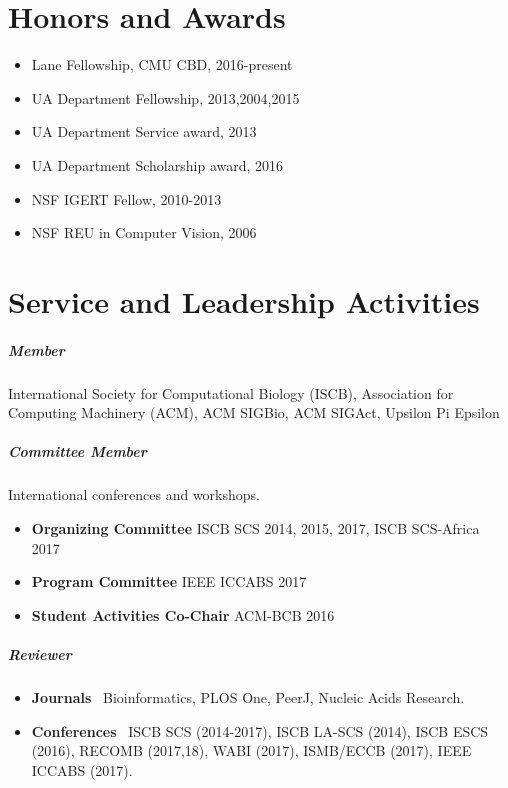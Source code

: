 \documentclass[10pt,letterpaper]{article}
\begin{document}
\section*{Honors and Awards}

\begin{itemize}
    \item Lane Fellowship, CMU CBD, 2016-present
    \item UA Department Fellowship, 2013,2004,2015
    \item UA Department Service award, 2013
    \item UA Department Scholarship award, 2016
    \item NSF IGERT Fellow, 2010-2013
    \item NSF REU in Computer Vision, 2006
\end{itemize}


\section*{Service and Leadership Activities}

\subparagraph{Member} International Society for Computational Biology (ISCB), Association for Computing Machinery (ACM), ACM SIGBio, ACM SIGAct, Upsilon Pi Epsilon
\subparagraph{Committee Member} International conferences and workshops.
\begin{itemize}
    \item \textbf{Organizing Committee} ISCB SCS 2014, 2015, 2017, ISCB SCS-Africa 2017 
    \item \textbf{Program Committee} IEEE ICCABS 2017
    \item \textbf{Student Activities Co-Chair} ACM-BCB 2016
\end{itemize}

\subparagraph{Reviewer} %
\begin{itemize}
    \item \textbf{Journals} \ 
        Bioinformatics,
        PLOS One, 
        PeerJ, 
        Nucleic Acids Research. 
    \item \textbf{Conferences} \ 
        ISCB SCS (2014-2017), %
        ISCB LA-SCS (2014), %
        ISCB ESCS (2016), 
	RECOMB (2017,18), %
	WABI (2017), %
	ISMB/ECCB (2017), %
    	 IEEE ICCABS (2017). %
\end{itemize}
\end{document}
